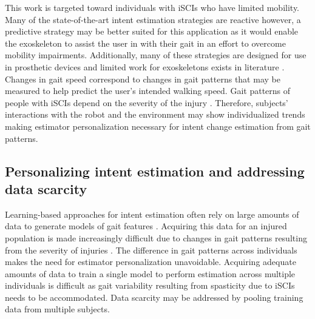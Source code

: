 This work is targeted toward individuals with iSCIs who have limited mobility. Many of the state-of-the-art intent estimation strategies are reactive however, a predictive strategy may be better suited for this application as it would enable the exoskeleton to assist the user in with their gait in an effort to overcome mobility impairments. Additionally, many of these strategies are designed for use in prosthetic devices \cite{young2013classifying,young2015classification,massalin2017user,thatte2019robust} and limited work for exoskeletons exists in literature \cite{medrano2022analysis}. Changes in gait speed correspond to changes in gait patterns that may be measured to help predict the user's intended walking speed. Gait patterns of people with iSCIs depend on the severity of the injury \cite{rota2011walk}. Therefore, subjects' interactions with the robot and the environment may show individualized trends making estimator personalization necessary for intent change estimation from gait patterns. 

\subsection{Personalizing intent estimation and addressing data scarcity}

Learning-based approaches for intent estimation often rely on large amounts of data to generate models of gait features \cite{lee2020image,moolchandani2021design}. Acquiring this data for an injured population is made increasingly difficult due to changes in gait patterns resulting from the severity of injuries \cite{sohn2018variability}. The difference in gait patterns across individuals makes the need for estimator personalization unavoidable. Acquiring adequate amounts of data to train a single model to perform estimation across multiple individuals is difficult as gait variability resulting from spasticity due to iSCIs \cite{krawetz1996gait} needs to be accommodated. Data scarcity may be addressed by pooling training data from multiple subjects.

